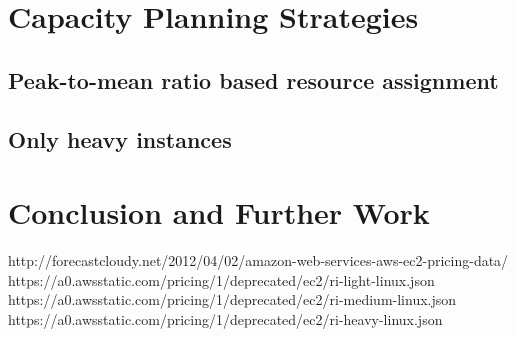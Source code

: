 \documentclass[]{final_report}
\begin{document}

\chapter{Capacity Planning Strategies}

\section{Peak-to-mean ratio based resource assignment}

\section{Only heavy instances}


\chapter{Conclusion and Further Work}


\newpage
\begin{thebibliography}{99}
 http://forecastcloudy.net/2012/04/02/amazon-web-services-aws-ec2-pricing-data/ https://a0.awsstatic.com/pricing/1/deprecated/ec2/ri-light-linux.json https://a0.awsstatic.com/pricing/1/deprecated/ec2/ri-medium-linux.json https://a0.awsstatic.com/pricing/1/deprecated/ec2/ri-heavy-linux.json
\end{thebibliography}
\label{endpage}
\end{document}
